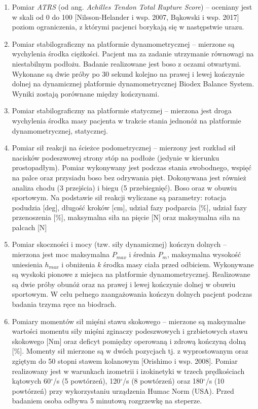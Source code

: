 \begin{enumerate}
	\item Pomiar \textit{ATRS} (od ang. \textit{Achilles Tendon Total Rupture Score}) -- oceniany jest w skali od 0 do 100 [Nilsson-Helander i wsp. 2007, Bąkowski i wsp. 2017] poziom ograniczenia, z którymi pacjenci borykają się w następstwie urazu.
	\item Pomiar stabilograficzny na platformie dynamometrycznej -- mierzone są wychylenia środka ciężkości. Pacjent ma za zadanie utrzymanie równowagi na niestabilnym podłożu. Badanie realizowane jest boso z oczami otwartymi. Wykonane są dwie próby po 30 sekund kolejno na prawej i lewej kończynie dolnej na dynamicznej platformie dynamometrycznej Biodex Balance System. Wyniki zostają porównane między kończynami. 
	\item Pomiar stabilograficzny na platformie statycznej -- mierzona jest droga wychylenia środka masy pacjenta w trakcie stania jednonóż na platformie dynamometrycznej, statycznej.
	\item Pomiar sił reakcji na ścieżce podometrycznej -- mierzony jest rozkład sił nacisków podeszwowej strony stóp na podłoże (jedynie w kierunku prostopadłym). Pomiar wykonywany jest podczas stania swobodnego, wspięć na palce oraz przysiadu boso bez odrywania pięt. Dokonywana jest również analiza chodu (3 przejścia) i biegu (5 przebiegnięć). Boso oraz w obuwiu sportowym. Na podstawie sił reakcji wyliczane są parametry: rotacja podudzia [deg], długość kroków [cm], udział fazy podparcia [\%], udział fazy przenoszenia [\%], maksymalna siła na pięcie [N] oraz maksymalna siła na palcach [N]
	\item Pomiar skoczności i mocy (tzw. siły dynamicznej) kończyn dolnych -- mierzona jest moc maksymalna $P_{max}$ i średnia $P_m$, maksymalna wysokość uniesienia $h_{max}$ i obniżenia $k$ środka masy ciała przed odbiciem. Wykonywane są wyskoki pionowe z miejsca na platformie dynamometrycznej. Realizowane są dwie próby obunóż oraz na prawej i lewej kończynie dolnej w obuwiu sportowym. W celu pełnego zaangażowania kończyn dolnych pacjent podczas badania trzyma ręce na biodrach. 
	\item Pomiary momentów sił mięśni stawu skokowego -- mierzone są maksymalne wartości momentu siły mięśni zginaczy podeszwowych i grzbietowych stawu skokowego [Nm] oraz deficyt pomiędzy operowaną i zdrową kończyną dolną [\%]. Momenty sił mierzone są w dwóch pozycjach tj. z wyprostowanym oraz zgiętym do 50 stopni stawem kolanowym [Orishimo i wsp. 2008]. Pomiar realizowany jest w warunkach izometrii i izokinetyki w trzech prędkościach kątowych 60$^\circ$/s (5 powtórzeń), 120$^\circ$/s (8 powtórzeń) oraz 180$^\circ$/s (10 powtórzeń) przy wykorzystaniu urządzenia Humac Norm (USA). Przed badaniem osoba odbywa 5 minutową rozgrzewkę na steperze.
\end{enumerate}

